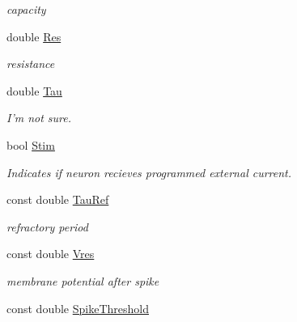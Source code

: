\begin{DoxyCompactItemize}
\begin{DoxyCompactList}\small\item\em capacity \end{DoxyCompactList}\item 
\hypertarget{classNeuron_af2e12ac8600a64cad710ea83bd29cbcd}{double \hyperlink{classNeuron_af2e12ac8600a64cad710ea83bd29cbcd}{Res}}\label{classNeuron_af2e12ac8600a64cad710ea83bd29cbcd}

\begin{DoxyCompactList}\small\item\em resistance \end{DoxyCompactList}\item 
\hypertarget{classNeuron_aae753d1a2059e2d1d5ad5fb5ff0220e8}{double \hyperlink{classNeuron_aae753d1a2059e2d1d5ad5fb5ff0220e8}{Tau}}\label{classNeuron_aae753d1a2059e2d1d5ad5fb5ff0220e8}

\begin{DoxyCompactList}\small\item\em I'm not sure. \end{DoxyCompactList}\item 
\hypertarget{classNeuron_a3a1e4838f35ae575cae5e3303e0cf973}{bool \hyperlink{classNeuron_a3a1e4838f35ae575cae5e3303e0cf973}{Stim}}\label{classNeuron_a3a1e4838f35ae575cae5e3303e0cf973}

\begin{DoxyCompactList}\small\item\em Indicates if neuron recieves programmed external current. \end{DoxyCompactList}\item 
\hypertarget{classNeuron_a653019ad78aa64d924ceadf73bebb8cf}{const double \hyperlink{classNeuron_a653019ad78aa64d924ceadf73bebb8cf}{Tau\-Ref}}\label{classNeuron_a653019ad78aa64d924ceadf73bebb8cf}

\begin{DoxyCompactList}\small\item\em refractory period \end{DoxyCompactList}\item 
\hypertarget{classNeuron_ae0829436587ff30135aea98ab3d18607}{const double \hyperlink{classNeuron_ae0829436587ff30135aea98ab3d18607}{Vres}}\label{classNeuron_ae0829436587ff30135aea98ab3d18607}

\begin{DoxyCompactList}\small\item\em membrane potential after spike \end{DoxyCompactList}\item 
\hypertarget{classNeuron_a6081f7edcd1f97ac1e486ba66f549e79}{const double \hyperlink{classNeuron_a6081f7edcd1f97ac1e486ba66f549e79}{Spike\-Threshold}}\label{classNeuron_a6081f7edcd1f97ac1e486ba66f549e79}


\end{DoxyCompactItemize}
